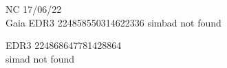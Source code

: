 NC 17/06/22\\
Gaia EDR3 224858550314622336
simbad not found

EDR3 224868647781428864 \\
simad not found\\